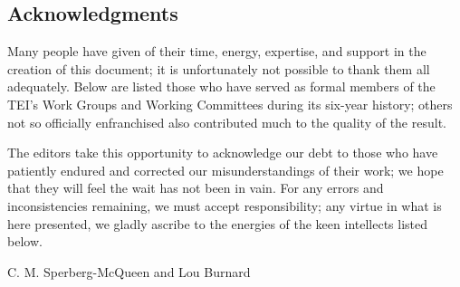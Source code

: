 \subsection[{Acknowledgments}]{Acknowledgments}\label{WG}\par
Many people have given of their time, energy, expertise, and support in the creation of this document; it is unfortunately not possible to thank them all adequately. Below are listed those who have served as formal members of the TEI's Work Groups and Working Committees during its six-year history; others not so officially enfranchised also contributed much to the quality of the result.\par
The editors take this opportunity to acknowledge our debt to those who have patiently endured and corrected our misunderstandings of their work; we hope that they will feel the wait has not been in vain. For any errors and inconsistencies remaining, we must accept responsibility; any virtue in what is here presented, we gladly ascribe to the energies of the keen intellects listed below.\par
C. M. Sperberg-McQueen and Lou Burnard
